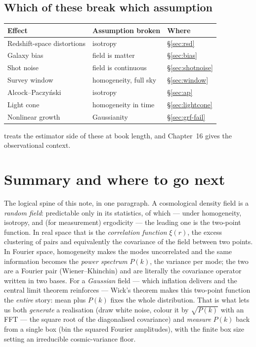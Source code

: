 \documentclass[12pt]{article}
\begin{document}
\subsection{Which of these break which assumption}
\label{sec:caveat-summary}

\begin{center}
\begin{tabular}{lll}
\toprule
Effect & Assumption broken & Where \\
\midrule
Redshift-space distortions & isotropy      & \S\ref{sec:rsd} \\
Galaxy bias                & field is matter & \S\ref{sec:bias} \\
Shot noise                 & field is continuous & \S\ref{sec:shotnoise} \\
Survey window              & homogeneity, full sky & \S\ref{sec:window} \\
Alcock--Paczy\'nski        & isotropy      & \S\ref{sec:ap} \\
Light cone                 & homogeneity in time & \S\ref{sec:lightcone} \\
Nonlinear growth           & Gaussianity   & \S\ref{sec:grf-fail} \\
\bottomrule
\end{tabular}
\end{center}

\noindent
\citet{MartinezSaar2002} treats the estimator side of these at book
length, and \citet{Peacock1999} Chapter~16 gives the observational
context.

\section{Summary and where to go next}
\label{sec:summary}

The logical spine of this note, in one paragraph.  A cosmological density
field is a \emph{random field}: predictable only in its statistics, of
which --- under homogeneity, isotropy, and (for measurement) ergodicity
--- the leading one is the two-point function.  In real space that is the
\emph{correlation function} $\xi(r)$, the excess clustering of pairs and
equivalently the covariance of the field between two points.  In Fourier
space, homogeneity makes the modes uncorrelated and the same information
becomes the \emph{power spectrum} $P(k)$, the variance per mode; the two
are a Fourier pair (Wiener--Khinchin) and are literally the covariance
operator written in two bases.  For a \emph{Gaussian} field --- which
inflation delivers and the central limit theorem reinforces --- Wick's
theorem makes this two-point function the \emph{entire} story: mean plus
$P(k)$ fixes the whole distribution.  That is what lets us both
\emph{generate} a realisation (draw white noise, colour it by
$\sqrt{P(k)}$ with an FFT --- the square root of the diagonalised
covariance) and \emph{measure} $P(k)$ back from a single box (bin the
squared Fourier amplitudes), with the finite box size setting an
irreducible cosmic-variance floor.
\end{document}
